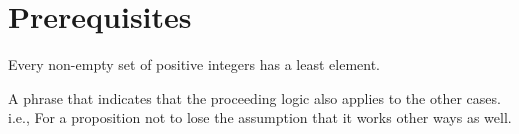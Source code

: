 \chapter*{Prerequisites}

\begin{Def}

    \label{def:well_ordering_principle}

    Every non-empty set of positive integers has a least element.
\end{Def}

\begin{Def}

    \label{def:wlog}

    A phrase that indicates that the proceeding logic also applies to the other cases.
    i.e., For a proposition not to lose the assumption that it works other ways as well.

\end{Def}

\newpage

